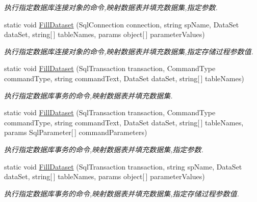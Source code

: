 \begin{DoxyCompactItemize}
\begin{DoxyCompactList}\small\item\em 执行指定数据库连接对象的命令,映射数据表并填充数据集,指定参数. \end{DoxyCompactList}\item 
static void \hyperlink{class_x_c_l_net_tools_1_1_data_base_1_1_m_s_s_q_l_1_1_sql_helper_ac33f99d73ee722075a70dbd35188ee68}{Fill\-Dataset} (Sql\-Connection connection, string sp\-Name, Data\-Set data\-Set, string\mbox{[}$\,$\mbox{]} table\-Names, params object\mbox{[}$\,$\mbox{]} parameter\-Values)
\begin{DoxyCompactList}\small\item\em 执行指定数据库连接对象的命令,映射数据表并填充数据集,指定存储过程参数值. \end{DoxyCompactList}\item 
static void \hyperlink{class_x_c_l_net_tools_1_1_data_base_1_1_m_s_s_q_l_1_1_sql_helper_a2ef17f7d356383da277662eb059a7689}{Fill\-Dataset} (Sql\-Transaction transaction, Command\-Type command\-Type, string command\-Text, Data\-Set data\-Set, string\mbox{[}$\,$\mbox{]} table\-Names)
\begin{DoxyCompactList}\small\item\em 执行指定数据库事务的命令,映射数据表并填充数据集. \end{DoxyCompactList}\item 
static void \hyperlink{class_x_c_l_net_tools_1_1_data_base_1_1_m_s_s_q_l_1_1_sql_helper_acf566f9b6876ad69bf9873e44bb832cc}{Fill\-Dataset} (Sql\-Transaction transaction, Command\-Type command\-Type, string command\-Text, Data\-Set data\-Set, string\mbox{[}$\,$\mbox{]} table\-Names, params Sql\-Parameter\mbox{[}$\,$\mbox{]} command\-Parameters)
\begin{DoxyCompactList}\small\item\em 执行指定数据库事务的命令,映射数据表并填充数据集,指定参数. \end{DoxyCompactList}\item 
static void \hyperlink{class_x_c_l_net_tools_1_1_data_base_1_1_m_s_s_q_l_1_1_sql_helper_afb18beaf4a2108c20ac7c16a46843301}{Fill\-Dataset} (Sql\-Transaction transaction, string sp\-Name, Data\-Set data\-Set, string\mbox{[}$\,$\mbox{]} table\-Names, params object\mbox{[}$\,$\mbox{]} parameter\-Values)
\begin{DoxyCompactList}\small\item\em 执行指定数据库事务的命令,映射数据表并填充数据集,指定存储过程参数值. \end{DoxyCompactList}\item 

\end{DoxyCompactItemize}
